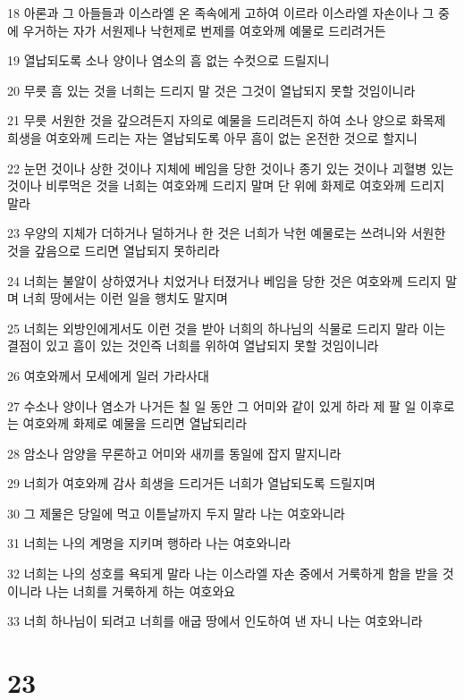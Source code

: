 \par 18 아론과 그 아들들과 이스라엘 온 족속에게 고하여 이르라 이스라엘 자손이나 그 중에 우거하는 자가 서원제나 낙헌제로 번제를 여호와께 예물로 드리려거든
\par 19 열납되도록 소나 양이나 염소의 흠 없는 수컷으로 드릴지니
\par 20 무릇 흠 있는 것을 너희는 드리지 말 것은 그것이 열납되지 못할 것임이니라
\par 21 무릇 서원한 것을 갚으려든지 자의로 예물을 드리려든지 하여 소나 양으로 화목제 희생을 여호와께 드리는 자는 열납되도록 아무 흠이 없는 온전한 것으로 할지니
\par 22 눈먼 것이나 상한 것이나 지체에 베임을 당한 것이나 종기 있는 것이나 괴혈병 있는 것이나 비루먹은 것을 너희는 여호와께 드리지 말며 단 위에 화제로 여호와께 드리지 말라
\par 23 우양의 지체가 더하거나 덜하거나 한 것은 너희가 낙헌 예물로는 쓰려니와 서원한 것을 갚음으로 드리면 열납되지 못하리라
\par 24 너희는 불알이 상하였거나 치었거나 터졌거나 베임을 당한 것은 여호와께 드리지 말며 너희 땅에서는 이런 일을 행치도 말지며
\par 25 너희는 외방인에게서도 이런 것을 받아 너희의 하나님의 식물로 드리지 말라 이는 결점이 있고 흠이 있는 것인즉 너희를 위하여 열납되지 못할 것임이니라
\par 26 여호와께서 모세에게 일러 가라사대
\par 27 수소나 양이나 염소가 나거든 칠 일 동안 그 어미와 같이 있게 하라 제 팔 일 이후로는 여호와께 화제로 예물을 드리면 열납되리라
\par 28 암소나 암양을 무론하고 어미와 새끼를 동일에 잡지 말지니라
\par 29 너희가 여호와께 감사 희생을 드리거든 너희가 열납되도록 드릴지며
\par 30 그 제물은 당일에 먹고 이튿날까지 두지 말라 나는 여호와니라
\par 31 너희는 나의 계명을 지키며 행하라 나는 여호와니라
\par 32 너희는 나의 성호를 욕되게 말라 나는 이스라엘 자손 중에서 거룩하게 함을 받을 것이니라 나는 너희를 거룩하게 하는 여호와요
\par 33 너희 하나님이 되려고 너희를 애굽 땅에서 인도하여 낸 자니 나는 여호와니라

\chapter{23}

